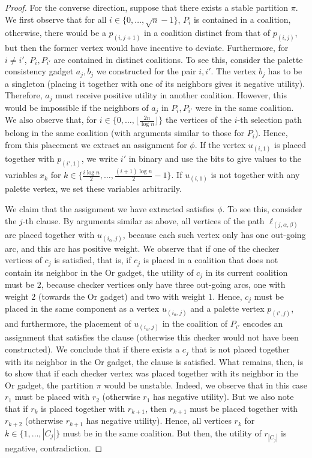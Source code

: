 \documentclass[letterpaper,USenglish,cleveref, autoref, thm-restate]{lipics-v2021}
\begin{document}
\begin{proof}
For the converse direction, suppose that there exists a stable partition $\pi$.
We first observe that for all $i\in\{0,\ldots,\sqrt{n}-1\}$, $P_i$ is contained
in a coalition, otherwise, there would be a $p_{(i,j+1)}$ in a coalition
distinct from that of $p_{(i,j)}$, but then the former vertex would have
incentive to deviate. Furthermore, for $i\neq i'$, $P_i, P_{i'}$ are contained
in distinct coalitions. To see this, consider the palette consistency gadget
$a_j,b_j$ we constructed for the pair $i,i'$. The vertex $b_j$ has to be a
singleton (placing it together with one of its neighbors gives it negative
utility). Therefore, $a_j$ must receive positive utility in another coalition.
However, this would be impossible if the neighbors of $a_{j}$ in $P_i, P_{i'}$
were in the same coalition. We also observe that, for
$i\in\{0,\ldots,\lfloor\frac{2n}{\log n}\rfloor\}$ the vertices of the $i$-th
selection path belong in the same coalition (with arguments similar to those
for $P_i$). Hence, from this placement we extract an assignment for $\phi$. If
the vertex $u_{(i,1)}$ is placed together with $p_{(i',1)}$, we write $i'$ in
binary and use the bits to give values to the variables $x_k$ for $k\in\{
\frac{i\log n}{2},\ldots,\frac{(i+1)\log n}{2}-1\}$. If $u_{(i,1)}$ is not
together with any palette vertex, we set these variables arbitrarily.

We claim that the assignment we have extracted satisfies $\phi$. To see this,
consider the $j$-th clause. By arguments similar as above, all vertices of the
path $\ell_{(j,\alpha,\beta)}$ are placed together with $u_{(i_{\alpha},j)}$,
because each such vertex only has one out-going arc, and this arc has positive
weight.  We observe that if one of the checker vertices of $c_j$ is satisfied,
that is, if $c_j$ is placed in a coalition that does not contain its neighbor
in the Or gadget, the utility of $c_j$ in its current coalition must be $2$,
because checker vertices only have three out-going arcs, one with weight $2$
(towards the Or gadget) and two with weight $1$. Hence, $c_j$ must be placed in
the same component as a vertex $u_{(i_{\alpha},j)}$ and a palette vertex
$p_{(i',j)}$, and furthermore, the placement of $u_{(i_{\alpha},j)}$ in the
coalition of $P_{i'}$ encodes an assignment that satisfies the clause
(otherwise this checker would not have been constructed).  We conclude that if
there exists a $c_j$ that is not placed together with its neighbor in the Or
gadget, the clause is satisfied.  What remains, then, is to show that if each
checker vertex was placed together with its neighbor in the Or gadget, the
partition $\pi$ would be unstable.  Indeed, we observe that in this case $r_1$
must be placed with $r_2$ (otherwise $r_1$ has negative utility). But we also
note that if $r_k$ is placed together with $r_{k+1}$, then $r_{k+1}$ must be
placed together with $r_{k+2}$ (otherwise $r_{k+1}$ has negative utility).
Hence, all vertices $r_k$ for $k\in\{1,\ldots,|C_j|\}$ must be in the same
coalition. But then, the utility of $r_{|C_j|}$ is negative, contradiction.
\end{proof}
\end{document}
